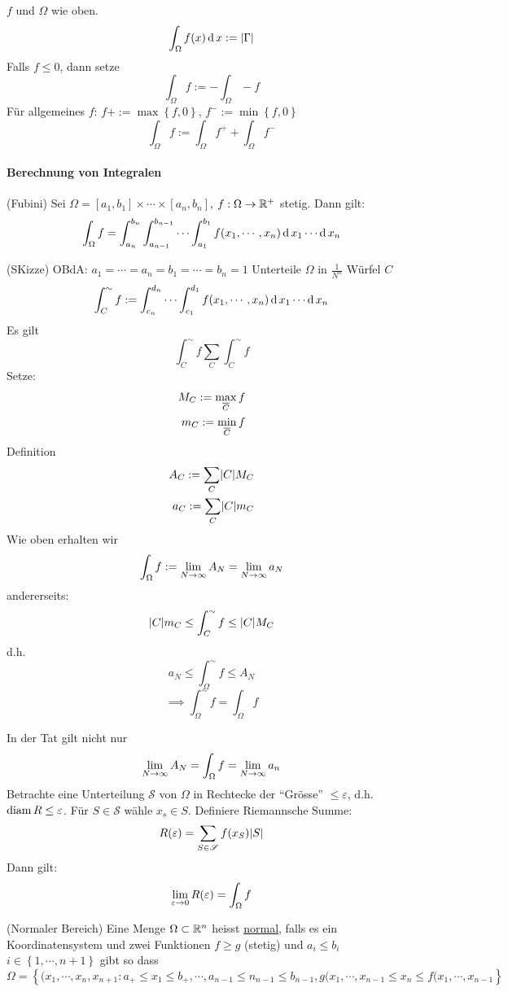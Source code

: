 \begin{Def}
  $f$ und $\Omega$ wie oben.
  \[\int_\Omega f(x)\operatorname{d} x:=\mathopen| \Gamma \mathclose|\]
  Falls $f\leq 0$, dann setze
  \[\int_\Omega f:=-\int_\Omega -f\]
  Für allgemeines $f$: $f+:=\max\left\{ f,0 \right\}$, $f^-:=\min\left\{ f,0 \right\}$
  \[\int_\Omega f:=\int_\Omega f^++\int_\Omega f^-\]
\end{Def}
\paragraph{Berechnung von Integralen}
\begin{Sat}
  (Fubini) Sei $\Omega=[a_1,b_1]\times\cdots\times [a_n,b_n]$, $f:\Omega\rightarrow\mathbb{R}^+$ stetig. Dann gilt:
  \[\int_\Omega f=\int_{a_n}^{b_n}\int_{a_{n-1}}^{b_{n-1}}\cdots\int_{a_1}^{b_1}f(x_1,\cdots,x_n)\operatorname{d} x_1\cdots\operatorname{d} x_n\]
\end{Sat}
\begin{Bew}
  (SKizze) OBdA: $a_1=\cdots=a_n=b_1=\cdots=b_n=1$ Unterteile $\Omega$ in $\frac{1}{N^n}$ Würfel $C$
  \[\int_C^\sim f:=\int_{c_n}^{d_n}\cdots\int_{c_1}^{d_1}f(x_1,\cdots,x_n)\operatorname{d} x_1\cdots\operatorname{d} x_n\]
  Es gilt
  \[\int_C^\sim f\sum_C\int_C^\sim f\]
  Setze:
  \begin{eqnarray*}
    M_C:=\max_{\overline{C}}f\\
    m_C:=\min_{\overline{C}}f
  \end{eqnarray*}
  Definition
  \begin{eqnarray*}
    A_C:=\sum_C\mathopen| C \mathclose|M_C\\
    a_C:=\sum_C\mathopen| C \mathclose|m_C\\
  \end{eqnarray*}
  Wie oben erhalten wir
  \[\int_\Omega f:=\displaystyle\lim_{N\rightarrow\infty}A_N=\displaystyle\lim_{N\rightarrow\infty}a_N\]
  andererseits:
  \[\mathopen| C \mathclose|m_C\leq\int_C^\sim f\leq\mathopen| C \mathclose|M_C\]
  d.h.
  \[a_N\leq \int_\Omega^\sim f\leq A_N\]
  \[\implies \int_\Omega^\sim f=\int_\Omega f\]
\end{Bew}
\begin{Bem}
  In der Tat gilt nicht nur
  \[\displaystyle\lim_{N\rightarrow\infty}A_N=\int_\Omega f=\displaystyle\lim_{N\rightarrow\infty}a_n\]
  Betrachte eine Unterteilung $\mathscr{S}$ von $\Omega$ in Rechtecke der ``Grösse'' $\leq\varepsilon$, d.h. $\operatorname{diam} R\leq \varepsilon$. Für $S\in\mathscr{S}$ wähle $x_s\in S$. Definiere Riemannsche Summe:
  \[R(\varepsilon)=\sum_{S\in\mathscr{S}}f(x_S)\mathopen| S \mathclose|\]
  Dann gilt:
  \[\displaystyle\lim_{\varepsilon\rightarrow0}R(\varepsilon)=\int_\Omega f\]
\end{Bem}
\begin{Def}
  (Normaler Bereich) Eine Menge $\Omega\subset\mathbb{R}^n$ heisst \ul{normal}, falls es ein Koordinatensystem und zwei Funktionen $f\geq g$ (stetig) und $a_i\leq b_i$ $i\in \left\{ 1,\cdots,n+1 \right\}$ gibt so dass
  \[\Omega=\left\{ (x_1,\cdots,x_n,x_{n+1}:a_+\leq x_1\leq b_+,\cdots,a_{n-1}\leq n_{n-1}\leq b_{n-1}, g(x_1,\cdots,x_{n-1}\leq x_n\leq f(x_1,\cdots,x_{n-1} \right\}\]
\end{Def}

